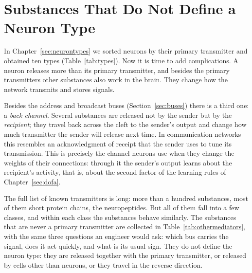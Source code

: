 \chapter{Substances That Do Not Define a Neuron Type}
\label{sec:othermediators}

In Chapter~\ref{sec:neurontypes} we sorted neurons by their primary transmitter and obtained ten types (Table~\ref{tab:types}). Now it is time to add complications. A neuron releases more than its primary transmitter, and besides the primary transmitters other substances also work in the brain. They change how the network transmits and stores signals.

Besides the address and broadcast buses (Section~\ref{sec:buses}) there is a third one: a \emph{back channel}. Several substances are released not by the sender but by the \emph{recipient}; they travel back across the cleft to the sender's output and change how much transmitter the sender will release next time. In communication networks this resembles an acknowledgment of receipt that the sender uses to tune its transmission. This is precisely the channel neurons use when they change the weights of their connections: through it the sender's output learns about the recipient's activity, that is, about the second factor of the learning rules of Chapter~\ref{sec:dofa}.

The full list of known transmitters is long: more than a hundred substances, most of them short protein chains, the neuropeptides. But all of them fall into a few classes, and within each class the substances behave similarly. The substances that are never a primary transmitter are collected in Table~\ref{tab:othermediators}, with the same three questions an engineer would ask: which bus carries the signal, does it act quickly, and what is its usual sign. They do not define the neuron type: they are released together with the primary transmitter, or released by cells other than neurons, or they travel in the reverse direction.

